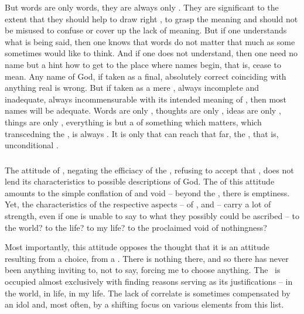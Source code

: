 \subpa
But words are only words, they are always only
.  They are significant to the extent that they should help 
to draw right , 
to grasp the meaning and should not be misused to confuse or cover up
the lack of meaning.  But if one understands what is being said, then
one knows that words do not matter that much as some sometimes would
like to think.  And if one does not understand, then one need no 
name but a hint how to get to the place where names begin, that is, 
cease to mean.
Any name of God, if taken as a final, absolutely
correct  coinciding with anything real is wrong.  But if
taken as a mere , always incomplete and inadequate, always
incommensurable with its intended meaning of , then
most names will be adequate.  Words are only , thoughts are
only , ideas are only , things are only
, everything  is but a  of something
which matters, which transcedning the \hoa, is always .
It is only  that can reach that far, the , that 
is, unconditional .  


\subsubsection{\No}
\pa
The attitude of , negating the efficiacy of the
, refusing to accept that , does not lend its characteristics to possible descriptions
of God. The   of this attitude amounts to the 
simple conflation of  and void -- beyond the 
, there is emptiness. Yet, the  
characteristics of the respective aspects -- of , 
 and  -- carry a lot of strength, 
even if one is unable to say to what they possibly could be 
ascribed -- to the world? to the life? to my life? to the proclaimed 
void of nothingness?  

Most importantly, this attitude opposes the thought that it is an
attitude resulting from a choice, from a \sch.  There is nothing
there, and so there has never been anything inviting to, not to say,
forcing me to choose anything.  The \No\ is occupied almost
exclusively with finding  reasons serving as its
justifications -- in the world, in life, in my life.  The lack of
 correlate is sometimes compensated by an idol and, most
often, by a shifting focus on various elements from this list.

